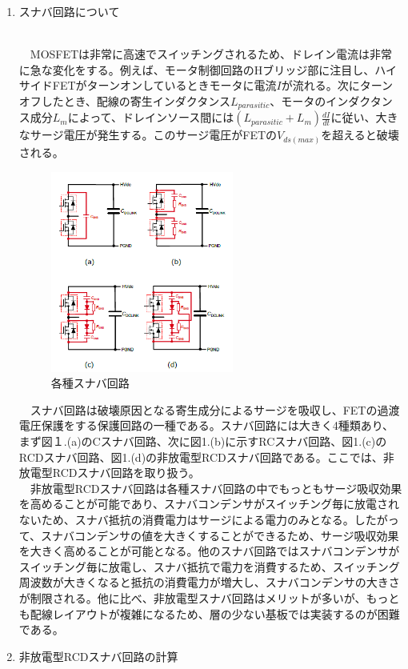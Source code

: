 \documentclass[12pt,a4paper,dvipdfmx]{jarticle}
\begin{document}
\begin{enumerate}
	\item \hypertarget{section1}{スナバ回路について}\\
		　MOSFETは非常に高速でスイッチングされるため、ドレイン電流は非常に急な変化をする。例えば、モータ制御回路のHブリッジ部に注目し、ハイサイドFETがターンオンしているときモータに電流$I$が流れる。次にターンオフしたとき、配線の寄生インダクタンス$L_{parasitic}$、モータのインダクタンス成分$L_{m}$によって、ドレインソース間には$(L_{parasitic}+L_{m})\frac{dI}{dt}$に従い、大きなサージ電圧が発生する。このサージ電圧がFETの$V_{ds(max)}$を超えると破壊される。\\
		\begin{figure}[H]
		\centering
		\includegraphics[width=6cm]{snb.jpg}
		\caption{各種スナバ回路}
		\end{figure}
		　スナバ回路は破壊原因となる寄生成分によるサージを吸収し、FETの過渡電圧保護をする保護回路の一種である。スナバ回路には大きく4種類あり、まず図１.(a)のCスナバ回路、次に図1.(b)に示すRCスナバ回路、図1.(c)のRCDスナバ回路、図1.(d)の非放電型RCDスナバ回路である。ここでは、非放電型RCDスナバ回路を取り扱う。\\
		　非放電型RCDスナバ回路は各種スナバ回路の中でもっともサージ吸収効果を高めることが可能であり、スナバコンデンサがスイッチング毎に放電されないため、スナバ抵抗の消費電力はサージによる電力のみとなる。したがって、スナバコンデンサの値を大きくすることができるため、サージ吸収効果を大きく高めることが可能となる。他のスナバ回路ではスナバコンデンサがスイッチング毎に放電し、スナバ抵抗で電力を消費するため、スイッチング周波数が大きくなると抵抗の消費電力が増大し、スナバコンデンサの大きさが制限される。他に比べ、非放電型スナバ回路はメリットが多いが、もっとも配線レイアウトが複雑になるため、層の少ない基板では実装するのが困難である。
	\item \hypertarget{section2}{非放電型RCDスナバ回路の計算}\\

\end{enumerate}
\end{document}
